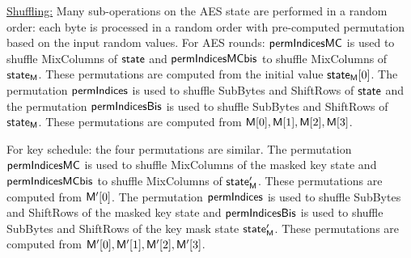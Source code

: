\noindent \underline{Shuffling:} Many sub-operations on the AES state are performed in a random order: each byte is processed in a random order with pre-computed permutation based on the input random values.
For AES rounds:
$\mathsf{permIndicesMC}$ is used to shuffle MixColumns of $\mathsf{state}$ and $\mathsf{permIndicesMCbis}$ to shuffle MixColumns of $\mathsf{state_M}$. These permutations are computed from the initial value $\mathsf{state_M}[0]$.  
The permutation $\mathsf{permIndices}$ is used to shuffle SubBytes and ShiftRows of $\mathsf{state} $ and the permutation $\mathsf{permIndicesBis}$ is used to shuffle SubBytes and ShiftRows of $\mathsf{state_M}$. These permutations are computed from $\mathsf{M}[0], \mathsf{M}[1], \mathsf{M}[2], \mathsf{M}[3]$.

For key schedule: the four permutations are similar. 
The permutation $\mathsf{permIndicesMC}$ is used to shuffle MixColumns of the masked key state and $\mathsf{permIndicesMCbis}$ to shuffle MixColumns of $\mathsf{state'_{M}}$. These permutations are computed from $\mathsf{M'}[0]$. 
The permutation $\mathsf{permIndices}$ is used to shuffle SubBytes and ShiftRows of the masked key state and $\mathsf{permIndicesBis}$ is used to shuffle SubBytes and ShiftRows of the key mask state $\mathsf{state'_{M}}$. These permutations are computed from $\mathsf{M'}[0], \mathsf{M'}[1], \mathsf{M'}[2], \mathsf{M'}[3]$.





